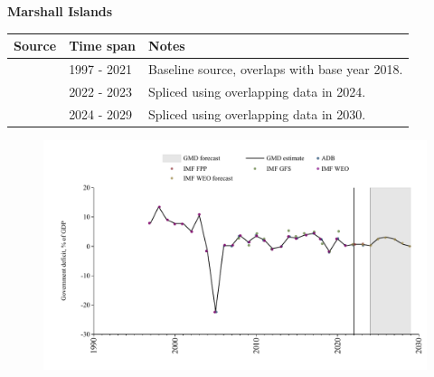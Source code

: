 \documentclass[12pt,a4paper,landscape]{article}
\begin{document}
\begin{adjustbox}{max totalsize={\paperwidth}{\paperheight},center}
\begin{minipage}[t][\textheight][t]{\textwidth}
\vspace*{0.5cm}
{}
\begin{center}
{\Large\bfseries Marshall Islands}
\end{center}
\vspace{0.5cm}
\begin{table}[H]
\centering
\small
\begin{tabular}{|l|l|l|}
\hline
\textbf{Source} & \textbf{Time span} & \textbf{Notes} \\
\hline
\rowcolor{white}\cite{IMF_WEO}& 1997 - 2021 &Baseline source, overlaps with base year 2018.\\
\rowcolor{lightgray}\cite{IMF_FPP}& 2022 - 2023 &Spliced using overlapping data in 2024.\\
\rowcolor{white}\cite{IMF_WEO_forecast}& 2024 - 2029 &Spliced using overlapping data in 2030.\\
\hline
\end{tabular}
\end{table}
\begin{figure}[H]
\centering
\includegraphics[width=\textwidth,height=0.6\textheight,keepaspectratio]{graphs/MHL_govdef_GDP.pdf}
\end{figure}
\end{minipage}
\end{adjustbox}
\end{document}
